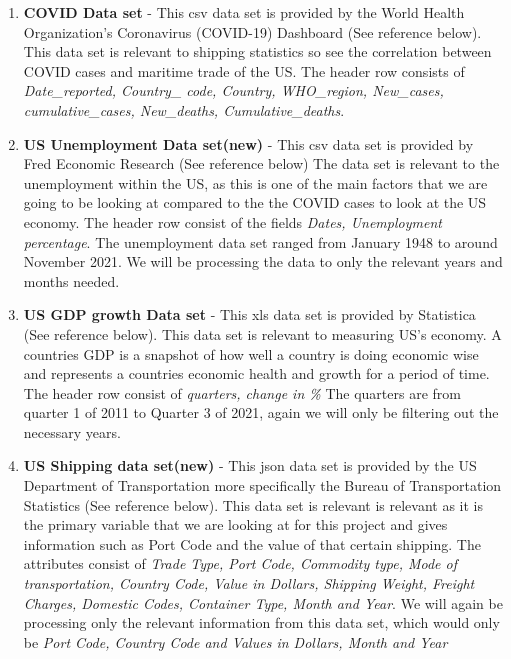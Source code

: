 \documentclass[fontsize=11pt]{article}
\begin{document}
\begin{enumerate}
    \item \textbf{COVID Data set} - This csv data set is provided by the World Health Organization's Coronavirus (COVID-19) Dashboard (See reference below). This data set is relevant to shipping statistics so see the correlation between COVID cases and maritime trade of the US. The header row consists of \textit{Date\_reported, Country\_ code, Country, WHO\_region, New\_cases, cumulative\_cases, New\_deaths, Cumulative\_deaths}.
    
    \item \textbf{US Unemployment Data set(new)} - This csv data set is provided by Fred Economic Research (See reference below) The data set is relevant to the unemployment within the US, as this is one of the main factors that we are going to be looking at compared to the the COVID cases to look at the US economy. The header row consist of the fields \textit{Dates, Unemployment percentage}. The unemployment data set ranged from January 1948 to around November 2021. We will be processing the data to only the relevant years and months needed.
    
    \item \textbf{US GDP growth Data set} - This xls data set is provided by Statistica (See reference below). This data set is relevant to measuring US's economy. A countries GDP is a snapshot of how well a country is doing economic wise and represents a countries economic health and growth for a period of time. The header row consist of \textit{quarters, change in \%} The quarters are from quarter 1 of 2011 to Quarter 3 of 2021, again we will only be filtering out the necessary years.
    
    \item \textbf{US Shipping data set(new)} - This json data set is provided by the US Department of Transportation more specifically the Bureau of Transportation Statistics (See reference below). This data set is relevant is relevant as it is the primary variable that we are looking at for this project and gives information such as Port Code and the value of that certain shipping. The attributes consist of \textit{Trade Type, Port Code, Commodity type, Mode of transportation, Country Code, Value in Dollars, Shipping Weight, Freight Charges, Domestic Codes, Container Type, Month and Year}. We will again be processing only the relevant information from this data set, which would only be \textit{Port Code, Country Code and Values in Dollars, Month and Year}
\end{enumerate}
\end{document}
